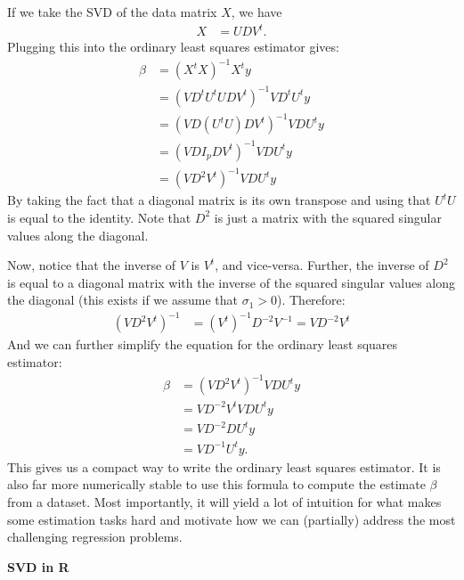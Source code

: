 \documentclass[12pt,hidelinks]{article}
\numberwithin{equation}{section}
\begin{document}
If we take the SVD of the data matrix $X$, we have
\begin{align}
X &= U D V^t.
\end{align}
Plugging this into the ordinary least squares estimator gives:
\begin{align}
\beta &= (X^t X)^{-1} X^t y \\
&= (V D^t U^t U D V^t)^{-1} V D^t U^t y \\
&= (V D (U^t U) D V^t)^{-1} V D U^t y \\
&= (V D I_p D V^t)^{-1} V D U^t y \\
&= (V D^2 V^t)^{-1} V D U^t y
\end{align}
By taking the fact that a diagonal matrix is its own transpose and using that
$U^t U$ is equal to the identity. Note that $D^2$ is just a matrix with the
squared singular values along the diagonal.

Now, notice that the inverse of $V$ is $V^t$, and vice-versa. Further, the
inverse of $D^{2}$ is equal to a diagonal matrix with the inverse of the
squared singular values along the diagonal (this exists if we assume that
$\sigma_1 > 0$). Therefore:
\begin{align}
(V D^2 V^t)^{-1} &= (V^{t})^{-1} D^{-2} V^{-1} = V D^{-2} V^t
\end{align}
And we can further simplify the equation for the ordinary least squares
estimator:
\begin{align}
\beta &= (V D^2 V^t)^{-1} V D U^t y \\
&= V D^{-2} V^t V D U^t y \\
&= V D^{-2} D U^t y \\
&= V D^{-1} U^t y.
\end{align}
This gives us a compact way to write the ordinary least squares estimator.
It is also far more numerically stable to use this formula to compute the
estimate $\beta$ from a dataset. Most importantly, it will yield a lot of
intuition for what makes some estimation tasks hard and motivate how we can
(partially) address the most challenging regression problems.

\textbf{SVD in R}
\end{document}
